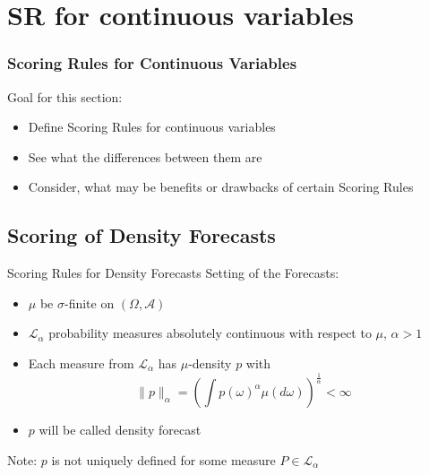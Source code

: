 \documentclass[aspectratio=43,10pt]{beamer}
\begin{document}
\section{SR for continuous variables}

\begin{frame}
  \frametitle{Scoring Rules for Continuous Variables}
  Goal for this section:
  \begin{itemize}
    \item Define Scoring Rules for continuous variables
    \item See what the differences between them are
    \item Consider, what may be benefits or drawbacks of certain Scoring Rules
    \end{itemize}
\end{frame}

\subsection{Scoring of Density Forecasts}

\begin{frame}{Scoring Rules for Density Forecasts}
    Setting of the Forecasts:
    \begin{itemize}
        \item $\mu$ be $\sigma$-finite on $(\Omega,\mathcal A)$
        \item $\mathcal{L}_\alpha$ probability measures absolutely continuous with respect to $\mu$, $\alpha>1$
        \item Each measure from $\mathcal L_\alpha$ has $\mu$-density $p$ with \begin{equation*}
            \lVert p\rVert_\alpha=\left(\int p(\omega)^\alpha\mu(d\omega)\right)^{\frac 1\alpha}<\infty
        \end{equation*}
        \item $p$ will be called density forecast
    \end{itemize}
    Note: $p$ is not uniquely defined for some measure $P\in\mathcal L_\alpha$
\end{frame}
\end{document}
